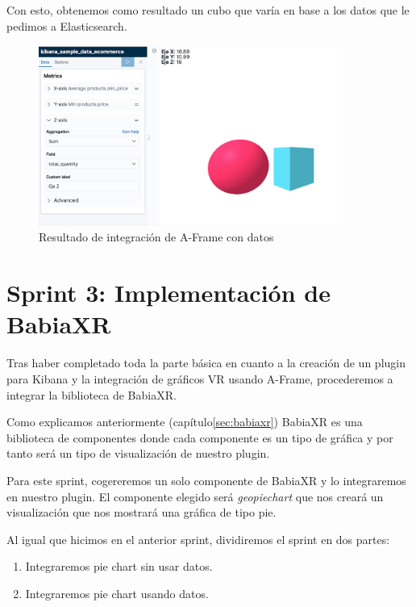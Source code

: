 \documentclass[a4paper, 12pt]{book}
\begin{document}
Con esto, obtenemos como resultado un cubo que varía en base a los datos que le pedimos a Elasticsearch.

\begin{figure}[H]
  \centering
  \includegraphics[width=10cm, keepaspectratio]{img/development/box_with_data.png}
  \caption{Resultado de integración de A-Frame con datos}
  \label{fig:boxwithdata}
\end{figure}



\section{Sprint 3: Implementación de BabiaXR }
\label{sec:sprint3}

Tras haber completado toda la parte básica en cuanto a la creación de un plugin para Kibana y la integración de gráficos VR usando A-Frame, procederemos a integrar la biblioteca de BabiaXR. 

Como explicamos anteriormente (capítulo\ref{sec:babiaxr}) BabiaXR es una biblioteca de componentes donde cada componente es un tipo de gráfica y por tanto será un tipo de visualización de nuestro plugin.

Para este sprint, cogereremos un solo componente de BabiaXR y lo integraremos en nuestro plugin. El componente elegido será \textit{geopiechart} que nos creará un visualización que nos mostrará una gráfica de tipo pie. 

Al igual que hicimos en el anterior sprint, dividiremos el sprint en dos partes:

\begin{enumerate}
    \item Integraremos pie chart sin usar datos.
    \item Integraremos pie chart usando datos.
\end{enumerate}

\end{document}
